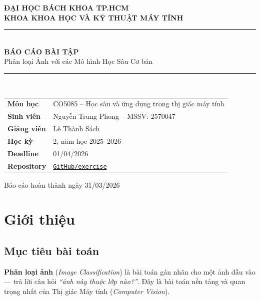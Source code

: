 \documentclass[12pt, a4paper]{article}
\begin{document}
\begin{titlepage}
  \centering
  \vspace*{1cm}
  {\large\bfseries ĐẠI HỌC BÁCH KHOA TP.HCM\\[0.3em]
   KHOA KHOA HỌC VÀ KỸ THUẬT MÁY TÍNH}\\[2em]
  \rule{\textwidth}{1.5pt}\\[0.5em]
  {\LARGE\bfseries\color{hcmutblue} BÁO CÁO BÀI TẬP}\\[0.5em]
  {\Large Phân loại Ảnh với các Mô hình Học Sâu Cơ bản}\\[0.5em]
  \rule{\textwidth}{1.5pt}\\[2.5em]

  \begin{tabular}{ll}
    \textbf{Môn học}    & CO5085 – Học sâu và ứng dụng trong thị giác máy tính \\[0.4em]
    \textbf{Sinh viên}  & Nguyễn Trung Phong – MSSV: 2570047 \\[0.4em]
    \textbf{Giảng viên} & Lê Thành Sách \\[0.4em]
    \textbf{Học kỳ}     & 2, năm học 2025–2026 \\[0.4em]
    \textbf{Deadline}   & 01/04/2026 \\[0.4em]
    \textbf{Repository} & \href{https://github.com/PhongNguyenTrung/hcmut-deeplearning-ass1/tree/main/exercise}{\texttt{GitHub/exercise}} \\
  \end{tabular}

  \vfill
  {\small Báo cáo hoàn thành ngày 31/03/2026}
\end{titlepage}

\tableofcontents
\newpage

\section{Giới thiệu}

\subsection{Mục tiêu bài toán}

\textbf{Phân loại ảnh} (\textit{Image Classification}) là bài toán gán nhãn cho một ảnh đầu vào --- trả lời câu hỏi \textit{``ảnh này thuộc lớp nào?''}. Đây là bài toán nền tảng và quan trọng nhất của Thị giác Máy tính (\textit{Computer Vision}).
\end{document}
